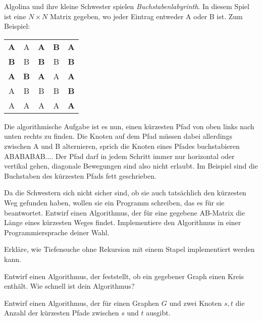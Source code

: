 \documentclass{uebung_cs}
\begin{document}
\begin{aufgabe}
	Algolina und ihre kleine Schwester spielen \emph{Buchstabenlabyrinth}.
	In diesem Spiel ist eine $N\times N$ Matrix gegeben, wo jeder Eintrag entweder A oder B ist. Zum Beispiel:
	\begin{center}
		\begin{tabular}{ccccc}
			\textbf{A} & A & \textbf{A} & \textbf{B} & \textbf{A}\\
			\textbf{B} & B & \textbf{B} & B & \textbf{B}\\
			\textbf{A} & \textbf{B} & \textbf{A} & A & \textbf{A}\\
			A & B & B & B & \textbf{B}\\
			A & A & A & A & \textbf{A}
		\end{tabular}
	\end{center}

	Die algorithmische Aufgabe ist es nun, einen kürzesten Pfad von oben links nach unten rechts zu finden.
	Die Knoten auf dem Pfad müssen dabei allerdings zwischen A und B alternieren, sprich die Knoten eines Pfades buchstabieren ABABABAB$\ldots$.
	Der Pfad darf in jedem Schritt immer nur horizontal oder vertikal gehen, diagonale Bewegungen sind also nicht erlaubt.
	Im Beispiel sind die Buchstaben des kürzesten Pfads fett geschrieben.

	Da die Schwestern sich nicht sicher sind, ob sie auch tatsächlich den kürzesten Weg gefunden haben, wollen sie ein Programm schreiben, das es für sie beantwortet.
	Entwirf einen Algorithmus, der für eine gegebene AB-Matrix die Länge eines kürzesten Weges findet.
	Implementiere den Algorithmus in einer Programmiersprache deiner Wahl.
\end{aufgabe}

\begin{aufgabe}
	Erkläre, wie Tiefensuche ohne Rekursion mit einem Stapel implementiert werden kann.
\end{aufgabe}

\begin{aufgabe}
	Entwirf einen Algorithmus, der feststellt, ob ein gegebener Graph einen Kreis enthält.
	Wie schnell ist dein Algorithmus?
\end{aufgabe}

\begin{aufgabe}
	Entwirf einen Algorithmus, der für einen Graphen $G$ und zwei Knoten $s,t$ die Anzahl der kürzesten Pfade zwischen $s$ und $t$ ausgibt.
\end{aufgabe}
\end{document}
